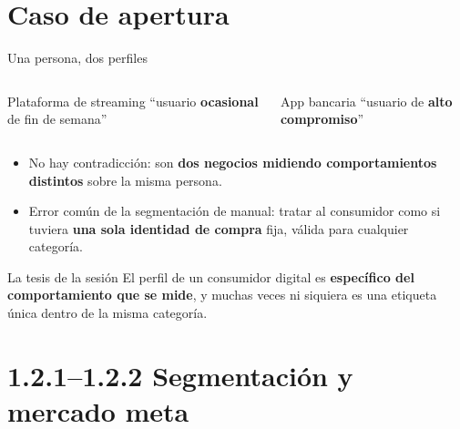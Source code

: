\documentclass[aspectratio=169,xcolor=dvipsnames]{beamer}
\begin{document}
\section[Apertura]{Caso de apertura}

\begin{frame}{Una persona, dos perfiles}
\begin{columns}[c]
  \begin{block}{Plataforma de streaming}
    \centering\enquote{usuario \textbf{ocasional} de fin de semana}
  \end{block}
  \begin{exampleblock}{App bancaria}
    \centering\enquote{usuario de \textbf{alto compromiso}}
  \end{exampleblock}
\end{columns}
\vspace{8pt}
\begin{itemize}
  \item No hay contradicción: son \textbf{dos negocios midiendo comportamientos distintos} sobre la misma persona.
  \item Error común de la segmentación de manual: tratar al consumidor como si tuviera \textbf{una sola identidad de compra} fija, válida para cualquier categoría.
\end{itemize}
\vspace{4pt}
\begin{alertblock}{La tesis de la sesión}
  El perfil de un consumidor digital es \textbf{específico del comportamiento que se mide}, y muchas veces ni siquiera es una etiqueta única dentro de la misma categoría.
\end{alertblock}
\end{frame}

\section[STP]{1.2.1--1.2.2 Segmentación y mercado meta}
\end{document}
